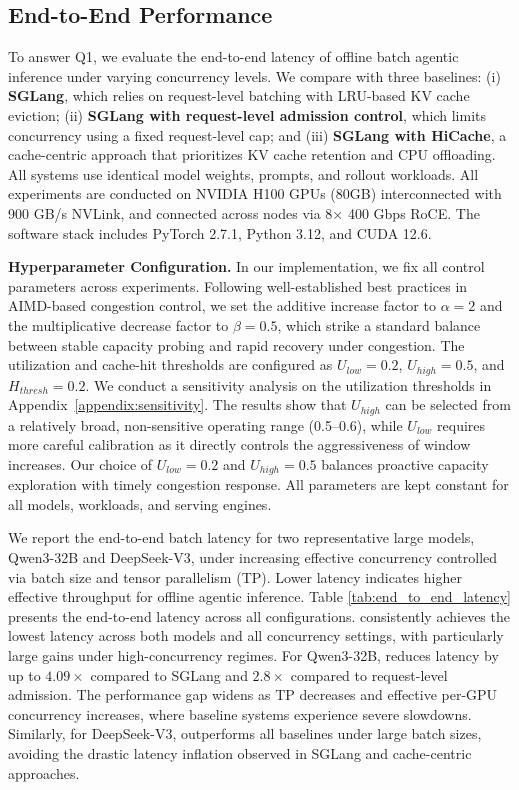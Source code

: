 \subsection{End-to-End Performance}
\label{subsec:evalrq1}
To answer Q1, we evaluate the end-to-end latency of offline batch agentic inference under varying concurrency levels.
We compare \SysName with three baselines:
(i) \textbf{SGLang}, which relies on request-level batching with LRU-based KV cache eviction;
(ii) \textbf{SGLang with request-level admission control}, which limits concurrency using a fixed request-level cap;
and (iii) \textbf{SGLang with HiCache}, a cache-centric approach that prioritizes KV cache retention and CPU offloading.
All systems use identical model weights, prompts, and rollout workloads. All experiments are conducted on NVIDIA H100 GPUs (80GB) interconnected with 900 GB/s NVLink, and connected across nodes via 8× 400 Gbps RoCE. The software stack includes PyTorch 2.7.1, Python 3.12, and CUDA 12.6.

\noindent\textbf{Hyperparameter Configuration.}
In our implementation, we fix all control parameters across experiments.
Following well-established best practices in AIMD-based congestion control, we set the additive increase factor to $\alpha = 2$ and the multiplicative decrease factor to $\beta = 0.5$, which strike a standard balance between stable capacity probing and rapid recovery under congestion. 
The utilization and cache-hit thresholds are configured as $U_{low} = 0.2$, $U_{high} = 0.5$, and $H_{thresh} = 0.2$. 
We conduct a sensitivity analysis on the utilization thresholds in Appendix~\ref{appendix:sensitivity}. 
The results show that $U_{high}$ can be selected from a relatively broad, non-sensitive operating range (0.5--0.6), while $U_{low}$ requires more careful calibration as it directly controls the aggressiveness of window increases. Our choice of $U_{low} = 0.2$ and $U_{high} = 0.5$ balances proactive capacity exploration with timely congestion response.
All parameters are kept constant for all models, workloads, and serving engines.




We report the end-to-end batch latency for two representative large models, Qwen3-32B and DeepSeek-V3, under increasing effective concurrency controlled via batch size and tensor parallelism (TP). Lower latency indicates higher effective throughput for offline agentic inference. Table \ref{tab:end_to_end_latency} presents the end-to-end latency across all configurations.
\SysName consistently achieves the lowest latency across both models and all concurrency settings, with particularly large gains under high-concurrency regimes. For Qwen3-32B, \SysName reduces latency by up to $4.09\times$ compared to SGLang and $2.8\times$ compared to request-level admission.
The performance gap widens as TP decreases and effective per-GPU concurrency increases, where baseline systems experience severe slowdowns.
Similarly, for DeepSeek-V3, \SysName outperforms all baselines under large batch sizes, avoiding the drastic latency inflation observed in SGLang and cache-centric approaches.

